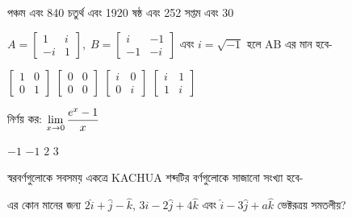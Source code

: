 \documentclass[addpoints]{exam}
\begin{document}
\begin{questions}
\begin{oneparchoices}
\choice পঞ্চম এবং 840 
\choice চতুর্থ এবং 1920
\choice  ষষ্ঠ এবং 252 
\choice সপ্তম এবং 30

\end{oneparchoices}

\question  $A = \begin{bmatrix}
1 & i \\
-i & 1
\end{bmatrix},\; B = \begin{bmatrix}
i & -1 \\
-1 & -i
\end{bmatrix} $ এবং $ i = \sqrt{-1} $ হলে AB এর মান হবে- 

\begin{oneparchoices}
\choice  $\begin{bmatrix}
1 & 0 \\
0 & 1
\end{bmatrix} $
\choice   $\begin{bmatrix}
0 & 0 \\
0 & 0
\end{bmatrix} $
\choice   $\begin{bmatrix}
i & 0 \\
0 & i
\end{bmatrix} $
\choice   $\begin{bmatrix}
i & 1 \\
1 & i
\end{bmatrix} $
\end{oneparchoices}

\question নির্ণয় কর: $ \mathlarger{\lim_{x\to 0} \dfrac{e^{x} -1}{x}} $

\begin{oneparchoices}
\choice $ -1 $
\choice $ -1 $
\choice $ 2 $
\choice  $ 3 $

\end{oneparchoices}

\question  স্বরবর্ণগুলোকে সবসময় একত্রে KACHUA শব্দটির বর্ণগুলোকে সাজানো সংখ্যা হবে-

\begin{oneparchoices}

\end{oneparchoices}

\question  {} এর কোন মানের জন্য $ 2\hat{i}+\hat{j}-\hat{k},\, 3\hat{i}-2\hat{j}+4\hat{k} $ এবং $ \hat{i}-3\hat{j}+a\hat{k} $ ভেক্টরত্রয় সমতলীয়?


\begin{oneparchoices}


\end{oneparchoices}
\end{questions}
\end{document}
